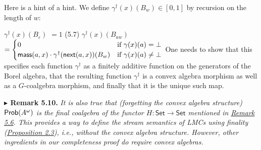 \documentclass[11pt,a4paper]{amsart}
\begin{document}
\par\medskip
\hypertarget{html:S5.SS0.SSS0.Px1.SPx1.p3}{} Here is a hint of a hint. We define %
\hypertarget{html:S5.SS0.SSS0.Px1.SPx1.p3.m1}{}\({\gamma^{{\dagger}}(x)(B_{w})\in[0,1]}\) by recursion on the length of %
\hypertarget{html:S5.SS0.SSS0.Px1.SPx1.p3.m2}{}\({w}\):
\par\medskip
\hypertarget{html:S5.E7}{}  %
\hypertarget{html:S5.E7X}{}  %
\hypertarget{html:S5.E7X.m2}{}\({\displaystyle\gamma^{{\dagger}}(x)(B_{\varepsilon})}\) %
\hypertarget{html:S5.E7X.m3}{}\({\displaystyle=1}\)  (5.7)  %
\hypertarget{html:S5.E7Xa}{}  %
\hypertarget{html:S5.E7Xa.m2}{}\({\displaystyle\gamma^{\dagger}(x)(B_{aw})}\) %
\hypertarget{html:S5.E7Xa.m3}{}\({\displaystyle=\begin{cases}0&\text{if $\gamma(x)(a)=\bot$}\\
\mbox{\sf mass}(a,x)\cdot\gamma^{\dagger}(\mbox{\sf next}(a,x))(B_{w})&\text{if $\gamma(x)(a)\neq\bot$}\end{cases}}\)     One needs to show that this specifies each function %
\hypertarget{html:S5.SS0.SSS0.Px1.SPx1.p3.m3}{}\({\gamma^{{\dagger}}}\) as a finitely additive function on the generators of the Borel algebra, that the resulting function %
\hypertarget{html:S5.SS0.SSS0.Px1.SPx1.p3.m4}{}\({\gamma^{\dagger}}\) is a convex algebra morphism as well as a %
\hypertarget{html:S5.SS0.SSS0.Px1.SPx1.p3.m5}{}\({G}\)-coalgebra morphism, and finally that it is the unique such map.
\par\medskip
\hypertarget{html:S5.Thmtheorem10}{} \par\noindent\textbf{%
\hypertarget{html:S5.Thmtheorem10.m1}{}\({\blacktriangleright}\) Remark 5.10.}\quad  %
\hypertarget{html:S5.Thmtheorem10.p1}{} \emph{It is also true that (forgetting the convex algebra structure) %
\hypertarget{html:S5.Thmtheorem10.p1.m1}{}\({\text{\sf Prob}(A^{\omega})}\) is the final coalgebra of the functor %
\hypertarget{html:S5.Thmtheorem10.p1.m2}{}\({H:\mathsf{Set}\to\mathsf{Set}}\) mentioned in \hyperlink{html:S5.Thmtheorem6}{Remark 5.6}. This provides a way to define the stream semantics of LMCs using finality (\hyperlink{html:S2.Thmtheorem3}{Proposition 2.3}), i.e., without the convex algebra structure. However, other ingredients in our completeness proof do require convex algebras.}
\end{document}
